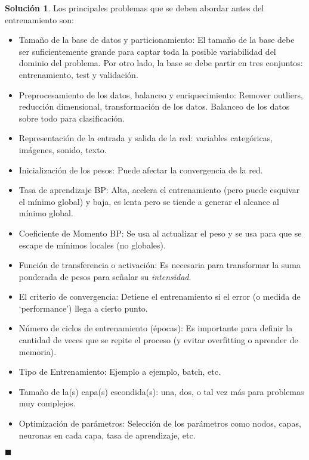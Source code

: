 \documentclass[12pt]{article}
\theoremstyle{plain}
\theoremstyle{definition}
\theoremstyle{definition}
\theoremstyle{definition}
\newtheorem*{solution}{Solución}
\begin{document}
\begin{solution}
Los principales problemas que se deben abordar antes del entrenamiento son:
\begin{itemize}
    \item[1.] Tamaño de la base de datos y particionamiento: El tamaño de la base debe ser suficientemente grande para captar toda la posible variabilidad del dominio del problema. Por otro lado, la base se debe partir en tres conjuntos: entrenamiento, test y validación.
    \item[2.] Preprocesamiento de los datos, balanceo y enriquecimiento: Remover outliers, reducción dimensional, transformación de los datos. Balanceo de los datos sobre todo para clasificación.
    \item[3.] Representación de la entrada y salida de la red: variables categóricas, imágenes, sonido, texto.
    \item[5.] Inicialización de los pesos: Puede afectar la convergencia de la red.
    \item[6.] Tasa de aprendizaje BP: Alta, acelera el entrenamiento (pero puede esquivar el mínimo global) y baja, es lenta pero se tiende a generar el alcance al mínimo global.
    \item[7.] Coeficiente de Momento BP: Se usa al actualizar el peso y se usa para que se escape de mínimos locales (no globales). 
    \item[8.] Función de transferencia o activación: Es necesaria para transformar la suma ponderada de pesos para señalar su \textit{intensidad}.  
    \item[9.] El criterio de convergencia: Detiene el entrenamiento si el error (o medida de `performance') llega a cierto punto.
    \item[10.] Número de ciclos de entrenamiento (épocas): Es importante para definir la cantidad de veces que se repite el proceso (y evitar overfitting o aprender de memoria). 
    \item[11.] Tipo de Entrenamiento: Ejemplo a ejemplo, batch, etc. 
    \item[12.] Tamaño de la(s) capa(s) escondida(s): una, dos, o tal vez más para problemas muy complejos. 
    \item[13.] Optimización de parámetros: Selección de los parámetros como nodos, capas, neuronas en cada capa, tasa de aprendizaje, etc.
\end{itemize}
\end{solution}
\begin{flushright}
$\blacksquare$
\end{flushright}
\end{document}
